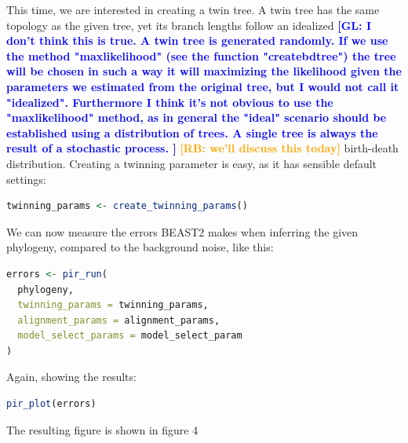 \documentclass{article}
\newcommand{\giovanni}[1]{\textcolor{blue}{\textbf{[GL: #1]}}}
\newcommand{\richel}[1]{\textcolor{orange}{\textbf{[RB: #1]}}}
\begin{document}
This time, we are interested in creating a twin tree. A twin tree
has the same topology as the given tree, yet its branch lengths follow
an idealized 
\giovanni{
  I don't think this is true. A twin tree is generated randomly. 
  If we use the method "maxlikelihood" (see the function "createbdtree") 
  the tree will be chosen in such a way it will maximizing the likelihood 
  given the parameters we estimated from the original tree, 
  but I would not call it "idealized". Furthermore I think it's not obvious to 
  use the "maxlikelihood" method, as in general the "ideal" scenario should be 
  established using a distribution of trees. A single tree is always the result 
  of a stochastic process.
}
\richel{we'll discuss this today} 
birth-death distribution. Creating a twinning parameter is easy,
as it has sensible default settings:

\begin{lstlisting}[language=R, floatplacement=H, frame=single]
twinning_params <- create_twinning_params()
\end{lstlisting}

We can now measure the errors BEAST2
makes when inferring the given phylogeny, compared
to the background noise, like this:

\begin{lstlisting}[language=R, floatplacement=H, frame=single]
errors <- pir_run(
  phylogeny,
  twinning_params = twinning_params,
  alignment_params = alignment_params,
  model_select_params = model_select_param
)
\end{lstlisting}

Again, showing the results:

\begin{lstlisting}[language=R, floatplacement=H, frame=single]
pir_plot(errors)
\end{lstlisting}

The resulting figure is shown in figure 4
\end{document}

